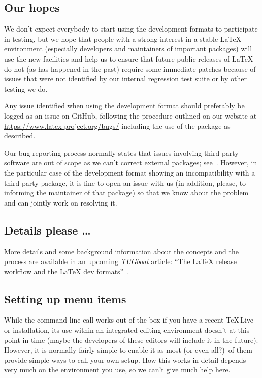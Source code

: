 \documentclass{ltnews}
\providecommand\MiKTeX{\hologo{MiKTeX}}
\providecommand\TL{\TeX\,Live}
\begin{document}
\subsection{Our hopes}

We don’t expect everybody to start using the development formats to
participate in testing, but we hope that people with a strong interest
in a stable \LaTeX{} environment (especially developers and maintainers
of important packages) will use the new facilities and help us to
ensure that future public releases of \LaTeX{} do not (as has happened in
the past) require some immediate patches because of issues that were
not identified by our internal regression test suite or by other
testing
we do.

Any issue identified when using the development format should
preferably be logged as an issue on GitHub, following the procedure
outlined on our website at \url{https://www.latex-project.org/bugs/}
including the use of the  package as described.

Our bug reporting process normally states that issues involving
third-party software are out of scope as we can’t correct external
packages; see~\cite{30:Mittelbach:TB39-1}. However, in the particular
case of the development format showing an incompatibility with a
third-party package, it is fine to open an issue with us (in addition,
please, to informing the maintainer of that package) so that we know
about the problem and can jointly work on resolving it.

\subsection{Details please \ldots}

More details and some background information about the concepts and
the process are available in an upcoming \textsl{TUGboat} article: \enquote{The
  \LaTeX{} release workflow and the \LaTeX{} dev
  formats}~\cite{devformat}.

\subsection{Setting up menu items}

While the command line call works out of the box if you have a recent
\TL{} or \MiKTeX{} installation, its use within an integrated
editing environment doesn’t at this point in time (maybe the
developers of these editors will include it in the future). However,
it is normally fairly simple to enable it as most (or even all?)\ of
them provide simple ways to call your own setup. How this works in
detail depends very much on the environment you use, so we can’t give
much help here.
\end{document}
